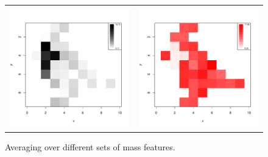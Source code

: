 \documentclass{article}
\begin{document}
\begin{figure}
\begin{center}
\begin{tabular}{cc}
\includegraphics{Cardinal-plotting-025}
&
\includegraphics{Cardinal-plotting-026}
\end{tabular}
\caption{\small Averaging over different sets of mass features.}
\end{center}
\end{figure}
\end{document}
